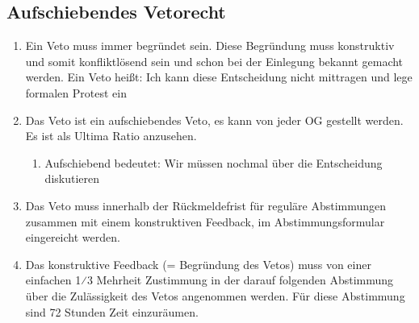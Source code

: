 \documentclass[a4paper,
  ]{scrartcl}
\begin{document}
\subsection{Aufschiebendes Vetorecht}
\begin{enumerate}
      \item Ein Veto muss immer begründet sein. Diese Begründung muss konstruktiv und somit konfliktlösend
            sein und schon bei der Einlegung bekannt gemacht werden.
            Ein Veto heißt: \glqq{}Ich kann diese Entscheidung nicht mittragen und lege formalen Protest ein\grqq
      \item Das Veto ist ein aufschiebendes Veto, es kann von jeder OG gestellt werden. Es ist als Ultima Ratio
            anzusehen.
            \begin{enumerate}
                  \item Aufschiebend bedeutet: \glqq{}Wir müssen nochmal über die Entscheidung diskutieren\grqq
            \end{enumerate}
      \item Das Veto muss innerhalb der Rückmeldefrist für reguläre Abstimmungen zusammen mit einem
            konstruktiven Feedback, im Abstimmungsformular eingereicht werden.
      \item Das konstruktive Feedback (= Begründung des Vetos) muss von einer einfachen 1⁄3 Mehrheit
            Zustimmung in der darauf folgenden Abstimmung über die Zulässigkeit des Vetos angenommen
            werden. Für diese Abstimmung sind 72 Stunden Zeit einzuräumen.
            \begin{enumerate}


\end{enumerate}
\end{enumerate}
\end{document}
